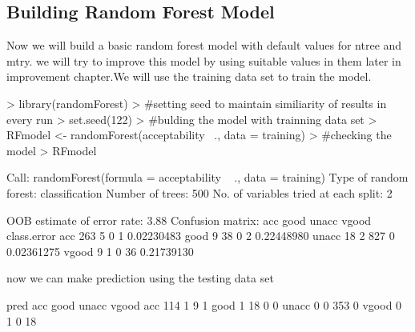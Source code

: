 \documentclass{article}
\begin{document}
\subsection{Building Random Forest Model}
Now we will build a basic random forest model with default values for ntree and mtry. we will try to improve this model by using suitable values in them later in improvement chapter.We will use the training data set to train the model.
\begin{Schunk}
\begin{Sinput}
> library(randomForest)
> #setting seed to maintain similiarity of results in every run
> set.seed(122)
> #bulding the model with trainning data set
> RFmodel <- randomForest(acceptability ~., data = training)
> #checking the model
> RFmodel
\end{Sinput}
\begin{Soutput}
Call:
 randomForest(formula = acceptability ~ ., data = training) 
               Type of random forest: classification
                     Number of trees: 500
No. of variables tried at each split: 2

        OOB estimate of  error rate: 3.88%
Confusion matrix:
      acc good unacc vgood class.error
acc   263    5     0     1  0.02230483
good    9   38     0     2  0.22448980
unacc  18    2   827     0  0.02361275
vgood   9    1     0    36  0.21739130
\end{Soutput}
\end{Schunk}
now we can make prediction using the testing data set
\begin{Schunk}
\begin{Soutput}
pred    acc good unacc vgood
  acc   114    1     9     1
  good    1   18     0     0
  unacc   0    0   353     0
  vgood   0    1     0    18
\end{Soutput}
\end{Schunk}
\end{document}
